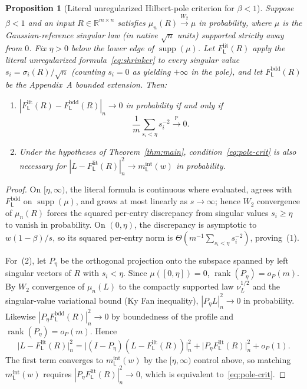 \documentclass[11pt]{article}
\theoremstyle{plain}
\newtheorem{proposition}[theorem]{Proposition}
\theoremstyle{definition}
\theoremstyle{remark}
\DeclareMathOperator{\rank}{rank}
\DeclareMathOperator{\supp}{supp}
\newcommand{\Prob}{\mathbb{P}}
\newcommand{\R}{\mathbb{R}}
\newcommand{\sL}{\mathsf{L}}
\begin{document}
\begin{proposition}[Literal unregularized Hilbert-pole criterion for $\beta < 1$]\label{prop:pole}
Suppose $\beta < 1$ and an input $R \in \R^{m\times n}$ satisfies $\mu_n(R) \xrightarrow{W_2} \mu$ in probability, where $\mu$ is the Gaussian-reference singular law (in native $\sqrt{n}$ units) supported strictly away from $0$. Fix $\eta > 0$ below the lower edge of $\supp(\mu)$. Let $F_{\sL}^{\mathrm{lit}}(R)$ apply the literal unregularized formula~\eqref{eq:shrinker} to every singular value $s_i = \sigma_i(R)/\sqrt{n}$ (counting $s_i = 0$ as yielding $+\infty$ in the pole), and let $F_{\sL}^{\mathrm{bdd}}(R)$ be the Appendix~A bounded extension. Then:
\begin{enumerate}[label=\textup{(\arabic*)},leftmargin=2em,itemsep=1pt]
\item $|F_{\sL}^{\mathrm{lit}}(R) - F_{\sL}^{\mathrm{bdd}}(R)|_n \to 0$ in probability if and only if
\begin{equation}\label{eq:pole-crit}
\frac{1}{m}\sum_{s_i < \eta} s_i^{-2} \xrightarrow{\Prob} 0.
\end{equation}
\item Under the hypotheses of Theorem~\ref{thm:main}, condition~\eqref{eq:pole-crit} is also necessary for $|L - F_{\sL}^{\mathrm{lit}}(R)|_n^2 \to m_{\sL}^{\mathrm{int}}(w)$ in probability.
\end{enumerate}
\end{proposition}

\begin{proof}
On $[\eta, \infty)$, the literal formula is continuous where evaluated, agrees with $F_{\sL}^{\mathrm{bdd}}$ on $\supp(\mu)$, and grows at most linearly as $s \to \infty$; hence $W_2$ convergence of $\mu_n(R)$ forces the squared per-entry discrepancy from singular values $s_i \ge \eta$ to vanish in probability. On $(0, \eta)$, the discrepancy is asymptotic to $w(1-\beta)/s$, so its squared per-entry norm is $\Theta(m^{-1}\sum_{s_i < \eta} s_i^{-2})$, proving~(1).

For~(2), let $P_\eta$ be the orthogonal projection onto the subspace spanned by left singular vectors of $R$ with $s_i < \eta$. Since $\mu([0, \eta]) = 0$, $\rank(P_\eta) = o_P(m)$. By $W_2$ convergence of $\mu_n(L)$ to the compactly supported law $\nu_L^{1/2}$ and the singular-value variational bound (Ky Fan inequality), $|P_\eta L|_n^2 \to 0$ in probability. Likewise $|P_\eta F_{\sL}^{\mathrm{bdd}}(R)|_n^2 \to 0$ by boundedness of the profile and $\rank(P_\eta) = o_P(m)$. Hence
\[
\bigl|L - F_{\sL}^{\mathrm{lit}}(R)\bigr|_n^2
= \bigl|(I - P_\eta)(L - F_{\sL}^{\mathrm{lit}}(R))\bigr|_n^2
  + \bigl|P_\eta F_{\sL}^{\mathrm{lit}}(R)\bigr|_n^2 + o_P(1).
\]
The first term converges to $m_{\sL}^{\mathrm{int}}(w)$ by the $[\eta,\infty)$ control above, so matching $m_{\sL}^{\mathrm{int}}(w)$ requires $|P_\eta F_{\sL}^{\mathrm{lit}}(R)|_n^2 \to 0$, which is equivalent to~\eqref{eq:pole-crit}.
\end{proof}
\end{document}

